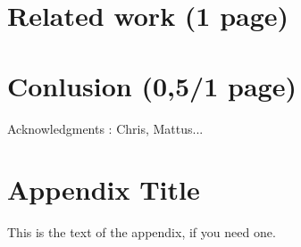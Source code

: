 \documentclass{sigplanconf}
\begin{document}
\section {Related work (1 page)}

\section {Conlusion (0,5/1 page)}


\acks

Acknowledgments : Chris, Mattus...





\appendix
\section{Appendix Title}

This is the text of the appendix, if you need one.
\end{document}

